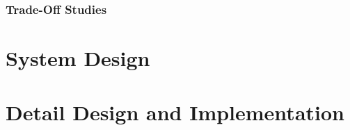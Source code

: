 \documentclass[a4paper,12pt]{article}
\numberwithin{equation}{section}
\numberwithin{figure}{section}
\numberwithin{table}{section}
\begin{document}
\subsubsection{Trade-Off Studies}

















\newpage
\section{System Design}





\newpage
\section{Detail Design and Implementation}
\end{document}

